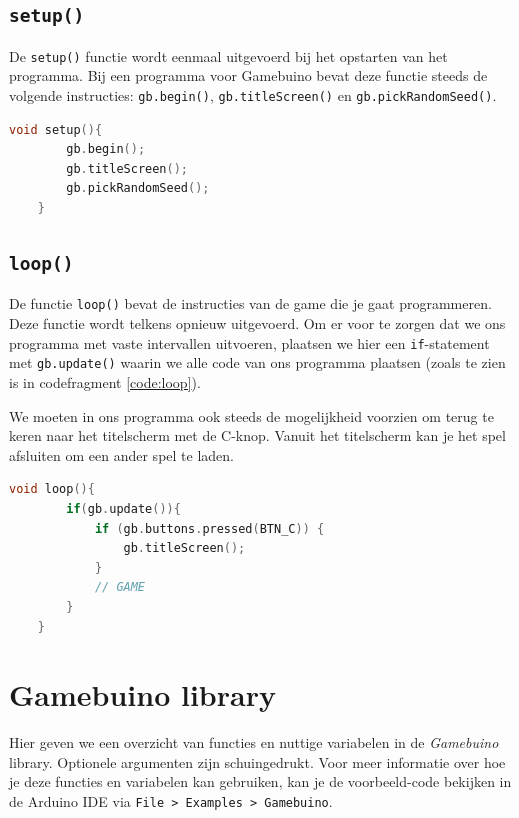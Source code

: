 \documentclass[a4paper,titlepage,12pt]{article}
\begin{document}
	
	\subsection{\texttt{setup()}}
	De \texttt{setup()} functie wordt eenmaal uitgevoerd bij het opstarten van het programma. Bij een programma voor Gamebuino bevat deze functie steeds de volgende instructies: \texttt{gb.begin()}, \texttt{gb.titleScreen()} en \texttt{gb.pickRandomSeed()}.
	\begin{lstlisting}[language=C++, caption={\texttt{setup()}}]
	void setup(){
		gb.begin();
		gb.titleScreen();
		gb.pickRandomSeed();
	}
	\end{lstlisting}
	
	
	\subsection{\texttt{loop()}}
	De functie \texttt{loop()} bevat de instructies van de game die je gaat programmeren. Deze functie wordt telkens opnieuw uitgevoerd. Om er voor te zorgen dat we ons programma met vaste intervallen uitvoeren, plaatsen we hier een \texttt{if}-statement met \texttt{gb.update()} waarin we alle code van ons programma plaatsen (zoals te zien is in codefragment \ref{code:loop}).
	
	We moeten in ons programma ook steeds de mogelijkheid voorzien om terug te keren naar het titelscherm met de C-knop. Vanuit het titelscherm kan je het spel afsluiten om een ander spel te laden.
	
	\begin{lstlisting}[float=!ht, language=C++, caption={\texttt{loop()}}, label={code:loop}]
	void loop(){
		if(gb.update()){
			if (gb.buttons.pressed(BTN_C)) {
				gb.titleScreen();
			}
			// GAME
		}
	}
	\end{lstlisting}
	
	
	\newpage
	\section{Gamebuino library}
	Hier geven we een overzicht van functies en nuttige variabelen in de \emph{Gamebuino} library.\cite{Gamebuino:Wiki:Reference}
	Optionele argumenten zijn schuingedrukt.
	Voor meer informatie over hoe je deze functies en variabelen kan gebruiken, kan je de voorbeeld-code bekijken in de Arduino IDE via \texttt{File > Examples > Gamebuino}.
	
\end{document}
